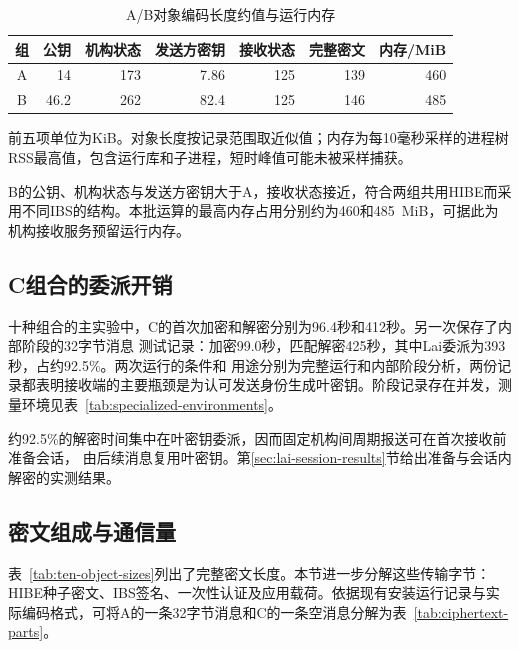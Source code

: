 \begin{table}[H]
\centering\small
\caption{A/B对象编码长度约值与运行内存}
\label{tab:ab-sizes}
\begin{tabular}{@{}crrrrrr@{}}
\toprule
\rowcolor{black!8} 组 & 公钥 & 机构状态 & 发送方密钥 & 接收状态 & 完整密文 & 内存/MiB \\
\midrule
A & 14 & 173 & 7.86 & 125 & 139 & 460 \\
B & 46.2 & 262 & 82.4 & 125 & 146 & 485 \\
\bottomrule
\end{tabular}
\begin{minipage}{.96\textwidth}\footnotesize
前五项单位为KiB。对象长度按记录范围取近似值；内存为每10毫秒采样的进程树RSS最高值，包含运行库和子进程，短时峰值可能未被采样捕获。
\end{minipage}
\end{table}

B的公钥、机构状态与发送方密钥大于A，接收状态接近，符合两组共用HIBE而采用不同IBS的结构。本批运算的最高内存占用分别约为460和485~MiB，可据此为机构接收服务预留运行内存。

\subsection{C组合的委派开销}
十种组合的主实验中，C的首次加密和解密分别为96.4秒和412秒。另一次保存了内部阶段的32字节消息
测试记录：加密99.0秒，匹配解密425秒，其中Lai委派为393秒，占约92.5\%。两次运行的条件和
用途分别为完整运行和内部阶段分析，两份记录都表明接收端的主要瓶颈是为认可发送身份生成叶密钥。阶段记录存在并发，测量环境见表~\ref{tab:specialized-environments}。

约92.5\%的解密时间集中在叶密钥委派，因而固定机构间周期报送可在首次接收前准备会话，
由后续消息复用叶密钥。第\ref{sec:lai-session-results}节给出准备与会话内解密的实测结果。

\subsection{密文组成与通信量}
表~\ref{tab:ten-object-sizes}列出了完整密文长度。本节进一步分解这些传输字节：HIBE种子密文、IBS签名、一次性认证及应用载荷。依据现有安装运行记录与实际编码格式，可将A的一条32字节消息和C的一条空消息分解为表~\ref{tab:ciphertext-parts}。

